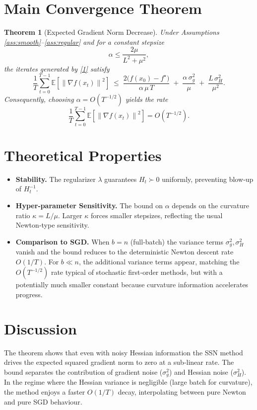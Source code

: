 \documentclass{article}
\newtheorem{theorem}{Theorem}
\newcommand{\EE}{\mathbb{E}}
\newcommand{\norm}[1]{\left\|#1\right\|}
\begin{document}
\section*{Main Convergence Theorem}
\begin{theorem}[Expected Gradient Norm Decrease]\label{thm:main}
Under Assumptions \ref{ass:smooth}–\ref{ass:regular} and for a constant stepsize
\[
\alpha\le \frac{2\mu}{L^{2}+ \mu^{2}},
\]
the iterates generated by \eqref{1} satisfy
\[
\frac{1}{T}\sum_{t=0}^{T-1}\EE\!\left[\norm{\nabla f(x_t)}^{2}\right]
\;\le\;
\frac{2\bigl(f(x_0)-f^\star\bigr)}{\alpha\,\mu\,T}
\;+\;
\frac{\alpha\,\sigma_g^{2}}{\mu}
\;+\;
\frac{L\,\sigma_H^{2}}{\mu^{2}} .
\tag{2}
\]
Consequently, choosing $\alpha=O(T^{-1/2})$ yields the rate
\[
\frac{1}{T}\sum_{t=0}^{T-1}\EE\!\left[\norm{\nabla f(x_t)}^{2}\right]=O\!\left(T^{-1/2}\right).
\]
\end{theorem}

\section*{Theoretical Properties}
\begin{itemize}[leftmargin=*]
\item \textbf{Stability.} The regularizer $\lambda$ guarantees $H_t\succ0$ uniformly, preventing blow‑up of $H_t^{-1}$.
\item \textbf{Hyper‑parameter Sensitivity.} The bound on $\alpha$ depends on the curvature ratio $\kappa=L/\mu$. Larger $\kappa$ forces smaller stepsizes, reflecting the usual Newton‑type sensitivity.
\item \textbf{Comparison to SGD.} When $b=n$ (full‑batch) the variance terms $\sigma_g^{2},\sigma_H^{2}$ vanish and the bound reduces to the deterministic Newton descent rate $O(1/T)$. For $b\ll n$, the additional variance terms appear, matching the $O(T^{-1/2})$ rate typical of stochastic first‑order methods, but with a potentially much smaller constant because curvature information accelerates progress.
\end{itemize}

\section*{Discussion}
The theorem shows that even with noisy Hessian information the SSN method drives the expected squared gradient norm to zero at a sub‑linear rate. The bound separates the contribution of gradient noise ($\sigma_g^{2}$) and Hessian noise ($\sigma_H^{2}$). In the regime where the Hessian variance is negligible (large batch for curvature), the method enjoys a faster $O(1/T)$ decay, interpolating between pure Newton and pure SGD behaviour.
\end{document}
